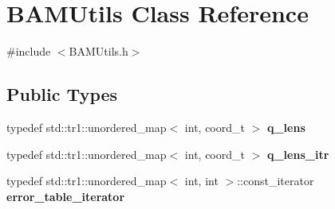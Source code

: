 \hypertarget{class_b_a_m_utils}{
\section{BAMUtils Class Reference}
\label{class_b_a_m_utils}
}


{\ttfamily \#include $<$BAMUtils.h$>$}

\subsection*{Public Types}
\begin{DoxyCompactItemize}
\item 
\hypertarget{class_b_a_m_utils_a837332763b5fedf126e460492dfb6ef4}{
typedef std::tr1::unordered\_\-map$<$ int, coord\_\-t $>$ {\bfseries q\_\-lens}}
\label{class_b_a_m_utils_a837332763b5fedf126e460492dfb6ef4}

\item 
\hypertarget{class_b_a_m_utils_a45936ccdf7b495622cc597adf70cd2b1}{
typedef std::tr1::unordered\_\-map$<$ int, coord\_\-t $>$ {\bfseries q\_\-lens\_\-itr}}
\label{class_b_a_m_utils_a45936ccdf7b495622cc597adf70cd2b1}

\item 
\hypertarget{class_b_a_m_utils_a9e90e85aa7d73123e56220df3a7b48cd}{
typedef std::tr1::unordered\_\-map$<$ int, int $>$::const\_\-iterator {\bfseries error\_\-table\_\-iterator}}
\label{class_b_a_m_utils_a9e90e85aa7d73123e56220df3a7b48cd}

\end{DoxyCompactItemize}
